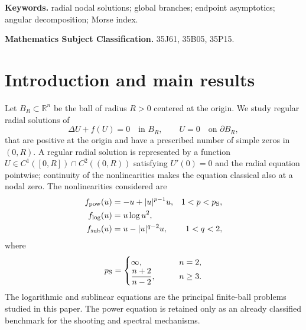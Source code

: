 \documentclass[11pt]{article}
\newcommand{\rev}[1]{{\color{red}#1}}
\begin{document}
\noindent\textbf{Keywords.}
{radial nodal solutions; global branches; endpoint asymptotics; angular decomposition; Morse index.}

\medskip
\noindent\textbf{Mathematics Subject Classification.}
{35J61, 35B05, 35P15.}

\section{Introduction and main results}
Let $B_R\subset\mathbb R^n$ be the ball of radius $R>0$ centered at the
origin.  We study regular radial solutions of
\begin{equation}\label{eq:unified-ball}
 \Delta U+f(U)=0\quad\text{in }B_R,
 \qquad U=0\quad\text{on }\partial B_R,
\end{equation}
that are positive at the origin and have a prescribed number of simple zeros
in $(0,R)$.  A regular radial solution is represented by a function
$U\in C^1([0,R])\cap C^2((0,R))$ satisfying $U'(0)=0$ and the radial
equation pointwise; continuity of the nonlinearities makes the equation
classical also at a nodal zero.  The nonlinearities considered are
\begin{align}
 f_{\rm pow}(u)&=-u+|u|^{p-1}u,
 &1<p<p_{\rm S},                                      \label{eq:intro-power}\\
 f_{\log}(u)&=u\log u^2,                                \\
 f_{\rm sub}(u)&=u-|u|^{q-2}u,
 &1<q<2,                                                  \label{eq:intro-sub}
\end{align}
where
\begin{equation*}
 p_{\rm S}=\begin{cases}
 \infty,\qquad  &n=2,\\
 \dfrac{n+2}{n-2},\qquad &n\ge3.
 \end{cases}
\end{equation*}
The logarithmic and sublinear equations are the {principal finite-ball
problems studied in this paper}. The power equation is retained only as an
already classified {benchmark for the shooting and spectral mechanisms}.

\end{document}

